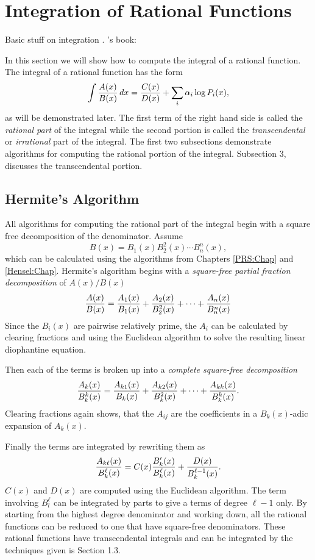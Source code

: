 \chapter{Integration of Rational Functions}
\label{Ration:Int:Chap}

Basic stuff on integration \cite{Rosenlicht72,Mead61,Ritt23a}.  {\Ritt}'s
book: \cite{Ritt48}  


In this section we will show how to compute the integral of a rational
function.  The integral of a rational function has the form
\[
\int {A(x) \over B(x)} \, dx 
  = {C(x) \over D(x)} + \sum_i \alpha_i \log P_i(x),
\]
as will be demonstrated later.  The first term of the right hand side is
called the {\em rational part} of the integral while the second portion is
called the {\em transcendental} or {\em irrational} part of the integral.
The first two subsections demonstrate algorithms for computing the rational
portion of the integral.  Subsection 3,  discusses the transcendental
portion. 

\section{Hermite's Algorithm}

All algorithms for computing the rational part of the integral begin with a
square free decomposition of the denominator.  Assume
\[
B(x) = B_1(x) B_2^2(x) \cdots B_n^n(x),
\]
which can be calculated using the algorithms from Chapters
\ref{PRS:Chap} and \ref{Hensel:Chap}.  Hermite's
algorithm begins with a {\em square-free partial fraction decomposition} of
$A(x)/B(x)$
\[
{A(x) \over B(x)} = 
{A_1(x) \over B_1(x)} + {A_2(x) \over B_2^2(x)} + \cdots +
{A_n(x) \over B_n^n(x)}
\]
Since the $B_i(x)$ are pairwise relatively prime, the $A_i$ can be
calculated by clearing fractions and using the Euclidean algorithm to
solve the resulting linear diophantine equation.

Then each of the terms is broken up into a {\em complete square-free
decomposition}
\[
{A_k(x) \over B_k^k(x)} = {A_{k1}(x) \over B_k(x)} +
{A_{k2}(x) \over B_k^2(x)} + \cdots + {A_{kk}(x) \over B_k^k(x)}.
\]
Clearing fractions again shows, that the $A_{ij}$ are the coefficients in a
$B_k(x)$-adic expansion of $A_k(x)$.

Finally the terms are integrated by rewriting them as 
\begin{equation} \label{Int:PF:Eq}
{A_{k\ell}(x) \over B_k^{\ell}(x)} = 
C(x) {B_k'(x) \over B_k^{\ell}(x)} +
{D(x) \over B_k^{\ell-1}(x)}.
\end{equation}
$C(x)$ and $D(x)$ are computed using the Euclidean algorithm.  The term
involving $B_l^{\ell}$ can be integrated by parts to give a terms of
degree $\ell - 1$ only.  By starting from the highest degree denominator
and working down, all the rational functions can be reduced to one that have
square-free denominators.  These rational functions have transcendental
integrals and can be integrated by the techniques given is Section 1.3.


